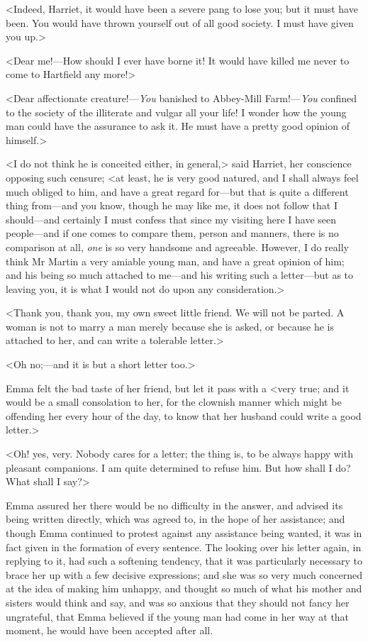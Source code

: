 <Indeed, Harriet, it would have been a severe pang to lose you; but it must have been. You would have thrown yourself out of all good society. I must have given you up.>

<Dear me!—How should I ever have borne it! It would have killed me never to come to Hartfield any more!>

<Dear affectionate creature!—\textit{You} banished to Abbey-Mill Farm!—\textit{You} confined to the society of the illiterate and vulgar all your life! I wonder how the young man could have the assurance to ask it. He must have a pretty good opinion of himself.>

<I do not think he is conceited either, in general,> said Harriet, her conscience opposing such censure; <at least, he is very good natured, and I shall always feel much obliged to him, and have a great regard for—but that is quite a different thing from—and you know, though he may like me, it does not follow that I should—and certainly I must confess that since my visiting here I have seen people—and if one comes to compare them, person and manners, there is no comparison at all, \textit{one} is so very handsome and agreeable. However, I do really think Mr Martin a very amiable young man, and have a great opinion of him; and his being so much attached to me—and his writing such a letter—but as to leaving you, it is what I would not do upon any consideration.>

<Thank you, thank you, my own sweet little friend. We will not be parted. A woman is not to marry a man merely because she is asked, or because he is attached to her, and can write a tolerable letter.>

<Oh no;—and it is but a short letter too.>

Emma felt the bad taste of her friend, but let it pass with a <very true; and it would be a small consolation to her, for the clownish manner which might be offending her every hour of the day, to know that her husband could write a good letter.>

<Oh! yes, very. Nobody cares for a letter; the thing is, to be always happy with pleasant companions. I am quite determined to refuse him. But how shall I do? What shall I say?>

Emma assured her there would be no difficulty in the answer, and advised its being written directly, which was agreed to, in the hope of her assistance; and though Emma continued to protest against any assistance being wanted, it was in fact given in the formation of every sentence. The looking over his letter again, in replying to it, had such a softening tendency, that it was particularly necessary to brace her up with a few decisive expressions; and she was so very much concerned at the idea of making him unhappy, and thought so much of what his mother and sisters would think and say, and was so anxious that they should not fancy her ungrateful, that Emma believed if the young man had come in her way at that moment, he would have been accepted after all.

